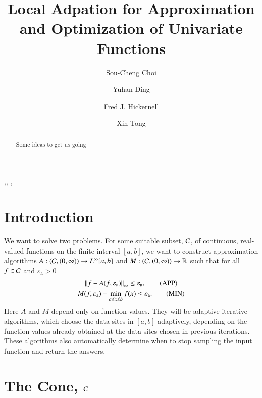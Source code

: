 \documentclass[review]{elsarticle}
\newcommand{\abstol}{\varepsilon_{\textrm{a}}}
\begin{document}
\begin{frontmatter}

\title{Local Adpation for Approximation and Optimization of Univariate Functions}


\author{Sou-Cheng Choi}
\author{Yuhan Ding}
\author{Fred J. Hickernell}
\author{Xin Tong}
\address{Department of Applied Mathematics, Illinois Institute of Technology, RE 208, 10 West 32$^{\text{nd}}$ Street, Chicago, Illinois, 60616, USA}

\begin{abstract}
Some ideas to get us going
\end{abstract}

\begin{keyword}
\sep \sep
\MSC[2010]  \sep
\end{keyword}

\end{frontmatter}

\section{Introduction} \label{sec:intro}

We want to solve two problems. For some suitable subset, $\mathcal{C}$, of continuous,
real-valued functions on the finite interval $[a,b]$, we want to construct approximation
algorithms $A:(\mathcal{C},(0,\infty)) \to L^{\infty}[a,b]$ and $M: (\mathcal{C},(0,\infty)) \to
\mathbb{R}$ such that for all $f \in \mathcal{C}$ and $\abstol > 0$
\begin{gather}
\norm[\infty]{f - A(f,\abstol)} \le \abstol,  \tag{APP} \label{appxprob} \\
M(f,\abstol) - \min_{a \le x \le b} f(x)  \le \abstol. \tag{MIN} \label{optprob}
\end{gather}
Here $A$ and $M$ depend only on function values. They will be adaptive iterative
algorithms, which choose the data sites in $[a,b]$ adaptively, depending on the
function values already obtained at the data sites chosen in previous iterations. These
algorithms also automatically determine when to stop sampling the input function
and return the answers.

\section{The Cone, $\mathcal{C}$} \label{sec:cone}
\end{document}
